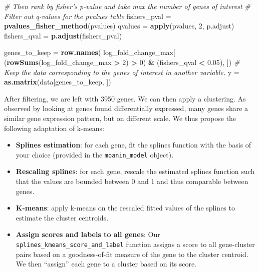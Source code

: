\documentclass[9pt,a4paper,]{extarticle}
\newenvironment{Shaded}{\begin{snugshade}}{\end{snugshade}}
\newcommand{\CommentTok}[1]{\textcolor[rgb]{0.56,0.35,0.01}{\textit{#1}}}
\newcommand{\DecValTok}[1]{\textcolor[rgb]{0.00,0.00,0.81}{#1}}
\newcommand{\FloatTok}[1]{\textcolor[rgb]{0.00,0.00,0.81}{#1}}
\newcommand{\KeywordTok}[1]{\textcolor[rgb]{0.13,0.29,0.53}{\textbf{#1}}}
\newcommand{\NormalTok}[1]{#1}
\newcommand{\OperatorTok}[1]{\textcolor[rgb]{0.81,0.36,0.00}{\textbf{#1}}}
\newcommand{\StringTok}[1]{\textcolor[rgb]{0.31,0.60,0.02}{#1}}
\begin{document}
\begin{Shaded}
\begin{Highlighting}[]
\CommentTok{# Then rank by fisher's p-value and take max the number of genes of interest}
\CommentTok{# Filter out q-values for the pvalues table}
\NormalTok{fishers_pval =}\StringTok{ }\KeywordTok{pvalues_fisher_method}\NormalTok{(pvalues)}
\NormalTok{qvalues =}\StringTok{ }\KeywordTok{apply}\NormalTok{(pvalues, }\DecValTok{2}\NormalTok{, p.adjust)}
\NormalTok{fishers_qval =}\StringTok{ }\KeywordTok{p.adjust}\NormalTok{(fishers_pval)}

\NormalTok{genes_to_keep =}\StringTok{ }\KeywordTok{row.names}\NormalTok{(}
\NormalTok{    log_fold_change_max[}
\NormalTok{    (}\KeywordTok{rowSums}\NormalTok{(log_fold_change_max }\OperatorTok{>}\StringTok{ }\DecValTok{2}\NormalTok{) }\OperatorTok{>}\StringTok{ }\DecValTok{0}\NormalTok{) }\OperatorTok{&}
\StringTok{    }\NormalTok{(fishers_qval }\OperatorTok{<}\StringTok{ }\FloatTok{0.05}\NormalTok{), ])}
\CommentTok{# Keep the data corresponding to the genes of interest in another variable.}
\NormalTok{y =}\StringTok{ }\KeywordTok{as.matrix}\NormalTok{(data[genes_to_keep, ])}
\end{Highlighting}
\end{Shaded}

After filtering, we are left with 3950 genes. We can then apply a
clustering. As observed by looking at genes found differentially expressed,
many genes share a similar gene expression pattern, but on different scale.
We thus propose the following adaptation of k-means:

\begin{itemize}
\tightlist
\item
  \textbf{Splines estimation}: for each gene, fit the splines function with the basis
  of your choice (provided in the \texttt{moanin\_model} object).
\item
  \textbf{Rescaling splines}: for each gene, rescale the estimated splines function
  such that the values are bounded between 0 and 1 and thus comparable between genes.
\item
  \textbf{K-means}: apply k-means on the rescaled fitted values of the splines to estimate the
  cluster centroids.
\item
  \textbf{Assign scores and labels to all genes}: Our
  \texttt{splines\_kmeans\_score\_and\_label} function assigns a score to all
  gene-cluster pairs based on a goodness-of-fit measure of the gene to the
  cluster centroid. We then ``assign'' each gene to a cluster based on its
  score.
\end{itemize}
\end{document}
